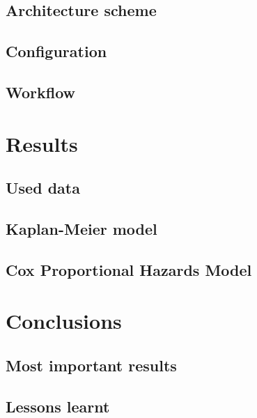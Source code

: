 \documentclass[11pt]{article} %
\begin{document}
\subsection{Architecture scheme}

\subsection{Configuration}

\subsection{Workflow}

\section{Results}

\subsection{Used data}

\subsection{Kaplan-Meier model}

\subsection{Cox Proportional Hazards Model}

\section{Conclusions}

\subsection{Most important results}

\subsection{Lessons learnt}
\end{document}
